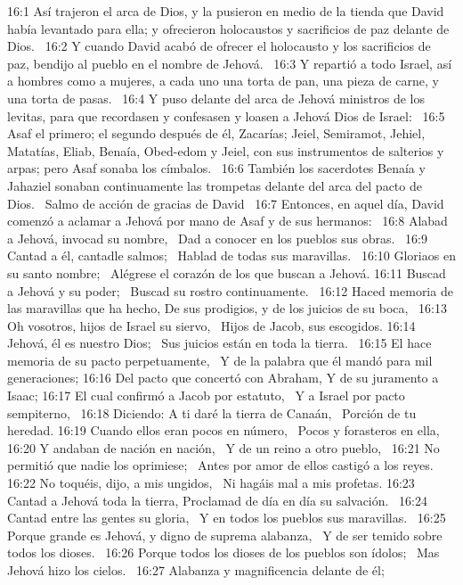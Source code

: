 16:1 Así trajeron el arca de Dios, y la pusieron en medio de la tienda que David había levantado para ella; y ofrecieron holocaustos y sacrificios de paz delante de Dios.  
16:2 Y cuando David acabó de ofrecer el holocausto y los sacrificios de paz, bendijo al pueblo en el nombre de Jehová.  
16:3 Y repartió a todo Israel, así a hombres como a mujeres, a cada uno una torta de pan, una pieza de carne, y una torta de pasas.  
16:4 Y puso delante del arca de Jehová ministros de los levitas, para que recordasen y confesasen y loasen a Jehová Dios de Israel:  
16:5 Asaf el primero; el segundo después de él, Zacarías; Jeiel, Semiramot, Jehiel, Matatías, Eliab, Benaía, Obed-edom y Jeiel, con sus instrumentos de salterios y arpas; pero Asaf sonaba los címbalos.  
16:6 También los sacerdotes Benaía y Jahaziel sonaban continuamente las trompetas delante del arca del pacto de Dios.  
Salmo de acción de gracias de David   
16:7 Entonces, en aquel día, David comenzó a aclamar a Jehová por mano de Asaf y de sus hermanos:  
16:8 Alabad a Jehová, invocad su nombre,  
Dad a conocer en los pueblos sus obras.  
16:9 Cantad a él, cantadle salmos;  
Hablad de todas sus maravillas.  
16:10 Gloriaos en su santo nombre;  
Alégrese el corazón de los que buscan a Jehová. 
16:11 Buscad a Jehová y su poder;  
Buscad su rostro continuamente.  
16:12 Haced memoria de las maravillas que ha hecho, 
De sus prodigios, y de los juicios de su boca,  
16:13 Oh vosotros, hijos de Israel su siervo,  
Hijos de Jacob, sus escogidos. 
16:14 Jehová, él es nuestro Dios;  
Sus juicios están en toda la tierra.  
16:15 El hace memoria de su pacto perpetuamente,  
Y de la palabra que él mandó para mil generaciones; 
16:16 Del pacto que concertó con Abraham, 
Y de su juramento a Isaac; 
16:17 El cual confirmó a Jacob por estatuto,  
Y a Israel por pacto sempiterno,  
16:18 Diciendo: A ti daré la tierra de Canaán,  
Porción de tu heredad. 
16:19 Cuando ellos eran pocos en número,  
Pocos y forasteros en ella,  
16:20 Y andaban de nación en nación,  
Y de un reino a otro pueblo,  
16:21 No permitió que nadie los oprimiese;  
Antes por amor de ellos castigó a los reyes. 
16:22 No toquéis, dijo, a mis ungidos,  
Ni hagáis mal a mis profetas. 
16:23 Cantad a Jehová toda la tierra, 
Proclamad de día en día su salvación.  
16:24 Cantad entre las gentes su gloria,  
Y en todos los pueblos sus maravillas.  
16:25 Porque grande es Jehová, y digno de suprema alabanza,  
Y de ser temido sobre todos los dioses.  
16:26 Porque todos los dioses de los pueblos son ídolos;  
Mas Jehová hizo los cielos.  
16:27 Alabanza y magnificencia delante de él;  
